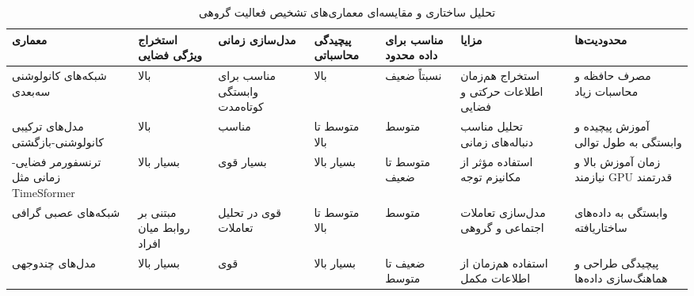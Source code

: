 \documentclass[12pt]{report}
\begin{document}
\begin{table}[H]
\centering
\caption{تحلیل ساختاری و مقایسه‌ای معماری‌های تشخیص فعالیت گروهی}
\label{tab:model_comparison}

\scriptsize
\setlength{\tabcolsep}{3pt}
\renewcommand{\arraystretch}{1.4}

\begin{tabular}{|m{2.2cm}|m{1.5cm}|m{1.5cm}|m{1.5cm}|m{1.5cm}|m{2cm}|m{2cm}|}
\hline

\centering \textbf{معماری} &
\centering \textbf{استخراج ویژگی فضایی} &
\centering \textbf{مدل‌سازی زمانی} &
\centering \textbf{پیچیدگی محاسباتی} &
\centering \textbf{مناسب برای داده محدود} &
\centering \textbf{مزایا} &
\centering \textbf{محدودیت‌ها}
\tabularnewline
\hline


\centering شبکه‌های کانولوشنی سه‌بعدی &
\centering بالا &
\centering مناسب برای وابستگی کوتاه‌مدت &
\centering بالا &
\centering نسبتاً ضعیف &
\centering استخراج هم‌زمان اطلاعات حرکتی و فضایی &
\centering مصرف حافظه و محاسبات زیاد
\tabularnewline
\hline

\centering مدل‌های ترکیبی کانولوشنی-بازگشتی &
\centering بالا &
\centering مناسب &
\centering متوسط تا بالا &
\centering متوسط &
\centering تحلیل مناسب دنباله‌های زمانی &
\centering آموزش پیچیده و وابستگی به طول توالی
\tabularnewline
\hline

\centering ترنسفورمر فضایی-زمانی مثل TimeSformer &
\centering بسیار بالا &
\centering بسیار قوی &
\centering بسیار بالا &
\centering متوسط تا ضعیف &
\centering استفاده مؤثر از مکانیزم توجه &
\centering زمان آموزش بالا و نیازمند GPU قدرتمند
\tabularnewline
\hline

\centering شبکه‌های عصبی گرافی &
\centering مبتنی بر روابط میان افراد &
\centering قوی در تحلیل تعاملات &
\centering متوسط تا بالا &
\centering متوسط &
\centering مدل‌سازی تعاملات اجتماعی و گروهی &
\centering وابستگی به داده‌های ساختاریافته
\tabularnewline
\hline

\centering مدل‌های چندوجهی &
\centering بسیار بالا &
\centering قوی &
\centering بسیار بالا &
\centering ضعیف تا متوسط &
\centering استفاده هم‌زمان از اطلاعات مکمل &
\centering پیچیدگی طراحی و هماهنگ‌سازی داده‌ها
\tabularnewline
\hline

\end{tabular}
\end{table}
\end{document}
